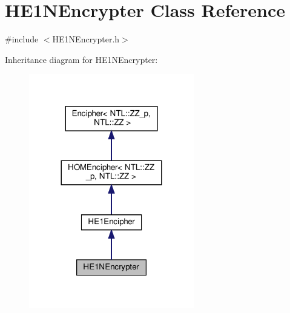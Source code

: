 \hypertarget{classHE1NEncrypter}{}\section{H\+E1\+N\+Encrypter Class Reference}
\label{classHE1NEncrypter}


{\ttfamily \#include $<$H\+E1\+N\+Encrypter.\+h$>$}



Inheritance diagram for H\+E1\+N\+Encrypter\+:
\nopagebreak
\begin{figure}[H]
\begin{center}
\leavevmode
\includegraphics[width=204pt]{classHE1NEncrypter__inherit__graph}
\end{center}
\end{figure}


